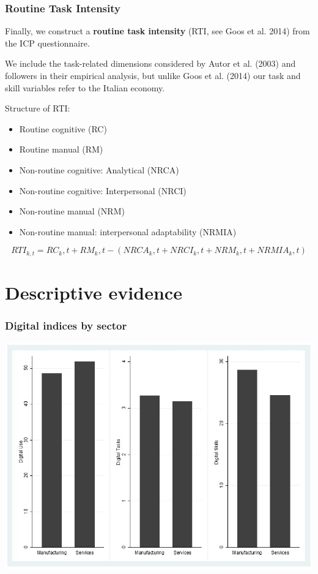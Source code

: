 \documentclass[10pt,xcolor={usenames,dvipsnames}]{beamer}
\begin{document}
\begin{frame}
\frametitle{Routine Task Intensity}

Finally, we construct a \textbf{routine task intensity} (RTI, see Goos et al. 2014) from the ICP questionnaire. 
\medskip

We include the task-related dimensions considered by Autor et al. (2003) and followers in their empirical analysis, but unlike Goos et al. (2014) our task and skill variables refer to the Italian economy.
\medskip

Structure of RTI: 
\begin{itemize}
\item Routine cognitive (RC)
\item Routine manual (RM)
\item Non-routine cognitive: Analytical (NRCA)
\item Non-routine cognitive: Interpersonal (NRCI)
\item Non-routine manual (NRM)
\item Non-routine manual: interpersonal adaptability (NRMIA)
\end{itemize}

\[RTI_{k,t} =  RC_k,t + RM_k,t - (NRCA_k,t + NRCI_k,t + NRM_k,t + NRMIA_k,t)\]

\end{frame}


\section{Descriptive evidence}

\begin{frame} 
\frametitle{Digital indices by sector}
\centering
\includegraphics[width=\linewidth,height=0.8\textheight,keepaspectratio]{Figures/1_digital_sector.jpg}
\end{frame}
\end{document}
